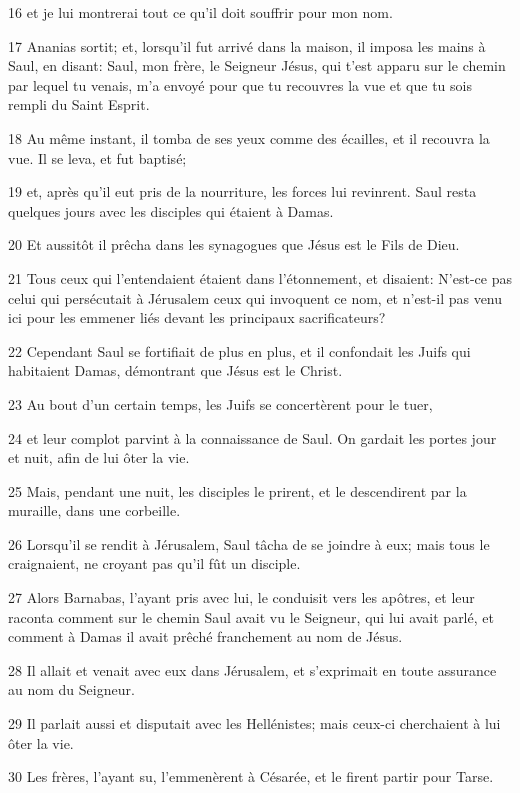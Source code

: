 \par 16 et je lui montrerai tout ce qu'il doit souffrir pour mon nom.
\par 17 Ananias sortit; et, lorsqu'il fut arrivé dans la maison, il imposa les mains à Saul, en disant: Saul, mon frère, le Seigneur Jésus, qui t'est apparu sur le chemin par lequel tu venais, m'a envoyé pour que tu recouvres la vue et que tu sois rempli du Saint Esprit.
\par 18 Au même instant, il tomba de ses yeux comme des écailles, et il recouvra la vue. Il se leva, et fut baptisé;
\par 19 et, après qu'il eut pris de la nourriture, les forces lui revinrent. Saul resta quelques jours avec les disciples qui étaient à Damas.
\par 20 Et aussitôt il prêcha dans les synagogues que Jésus est le Fils de Dieu.
\par 21 Tous ceux qui l'entendaient étaient dans l'étonnement, et disaient: N'est-ce pas celui qui persécutait à Jérusalem ceux qui invoquent ce nom, et n'est-il pas venu ici pour les emmener liés devant les principaux sacrificateurs?
\par 22 Cependant Saul se fortifiait de plus en plus, et il confondait les Juifs qui habitaient Damas, démontrant que Jésus est le Christ.
\par 23 Au bout d'un certain temps, les Juifs se concertèrent pour le tuer,
\par 24 et leur complot parvint à la connaissance de Saul. On gardait les portes jour et nuit, afin de lui ôter la vie.
\par 25 Mais, pendant une nuit, les disciples le prirent, et le descendirent par la muraille, dans une corbeille.
\par 26 Lorsqu'il se rendit à Jérusalem, Saul tâcha de se joindre à eux; mais tous le craignaient, ne croyant pas qu'il fût un disciple.
\par 27 Alors Barnabas, l'ayant pris avec lui, le conduisit vers les apôtres, et leur raconta comment sur le chemin Saul avait vu le Seigneur, qui lui avait parlé, et comment à Damas il avait prêché franchement au nom de Jésus.
\par 28 Il allait et venait avec eux dans Jérusalem, et s'exprimait en toute assurance au nom du Seigneur.
\par 29 Il parlait aussi et disputait avec les Hellénistes; mais ceux-ci cherchaient à lui ôter la vie.
\par 30 Les frères, l'ayant su, l'emmenèrent à Césarée, et le firent partir pour Tarse.
